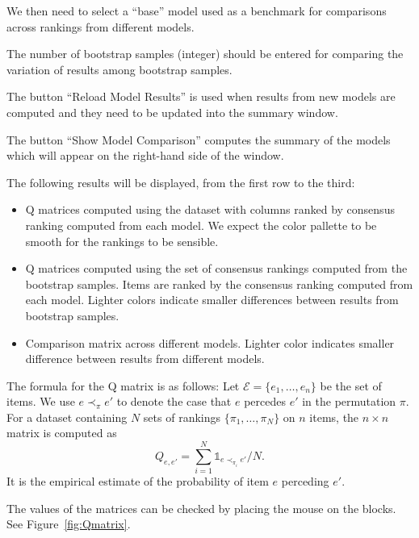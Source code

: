 \documentclass[a4paper,11pt]{memoir}
\begin{document}
We then need to select a ``base'' model used as a benchmark for comparisons across rankings from different models.

The number of bootstrap samples (integer) should be entered for comparing the variation of results among bootstrap samples.

The button ``Reload Model Results'' is used when results from new models are computed and they need to be updated into the summary window.

The button ``Show Model Comparison'' computes the summary of the models which will appear on the right-hand side of the window.


The following results will be displayed, from the first row to the third:
\begin{itemize}
  \item Q matrices computed using the dataset with columns ranked by consensus ranking computed from each model. We expect the color pallette to be smooth for the rankings to be sensible.

  \item Q matrices computed using the set of consensus rankings computed from the bootstrap samples. Items are ranked by the consensus ranking computed from each model. Lighter colors indicate smaller differences between results from bootstrap samples.

  \item Comparison matrix across different models. Lighter color indicates smaller difference between results from different models.
\end{itemize}

The formula for the Q matrix is as follows: 
Let $\mathcal{E} = \{e_1,\ldots, e_n\}$ be the set of items. 
We use $e \prec_\pi e'$ to denote the case that $e$ percedes $e'$ in the permutation $\pi$.
For a dataset containing $N$ sets of rankings $\{\pi_1,\ldots, \pi_N\}$ on $n$ items, 
the $n\times n$ matrix is computed as 
  \begin{equation}
    Q_{e,e'} = \sum_{i=1}^N\mathds{1}_{e \prec_{\pi_i} e'} / N.
  \end{equation}
It is the empirical estimate of the probability of item $e$ perceding $e'$.

The values of the matrices can be checked by placing the mouse on the blocks. 
See Figure~\ref{fig:Qmatrix}.
\end{document}
